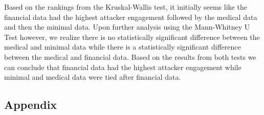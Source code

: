 \documentclass[12pt]{article}
\begin{document}
\indent Based on the rankings from the Kruskal-Wallis test, it initially seems like the financial data had the highest attacker engagement followed by the medical data and then the minimal data. Upon further analysis using the Mann-Whitney U Test however, we realize there is no statistically significant difference between the medical and minimal data while there is a statistically significant difference between the medical and financial data. Based on the results from both tests we can conclude that financial data had the highest attacker engagement while minimal and medical data were tied after financial data. \newline


\clearpage
\begin{center} \section*{\normalsize{Appendix}} \end{center}
\singlespacing
\end{document}
